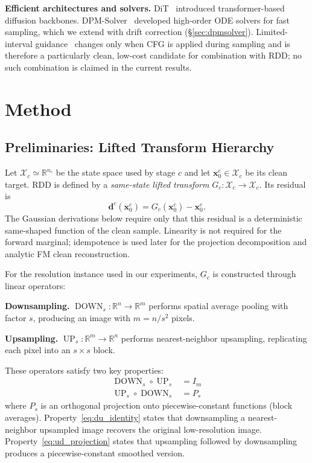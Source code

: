 \documentclass[10pt]{article}
\DeclareMathOperator{\DOWN}{DOWN}
\DeclareMathOperator{\UP}{UP}
\newcommand{\R}{\mathbb{R}}
\newcommand{\bx}{\bm{x}}
\newcommand{\bd}{\bm{d}}
\begin{document}
\textbf{Efficient architectures and solvers.}
DiT~\citep{peebles2023dit} introduced transformer-based diffusion backbones.
DPM-Solver~\citep{lu2022dpm} developed high-order ODE solvers for fast sampling, which we extend with drift correction (\S\ref{sec:dpmsolver}).
Limited-interval guidance~\citep{kynkaanniemi2024guidance} changes only when CFG is applied during sampling and is therefore a particularly clean, low-cost candidate for combination with RDD; no such combination is claimed in the current results.

\section{Method}
\label{sec:method}

\subsection{Preliminaries: Lifted Transform Hierarchy}
\label{sec:prelim}

Let $\mathcal X_c\simeq\R^{n_c}$ be the state space used by stage $c$ and let $\bx_0^c\in\mathcal X_c$ be its clean target. RDD is defined by a \emph{same-state lifted transform} $G_c:\mathcal X_c\to\mathcal X_c$. Its residual is
\begin{equation}
    \bd^c(\bx_0^c)=G_c(\bx_0^c)-\bx_0^c.
    \label{eq:general_residual}
\end{equation}
The Gaussian derivations below require only that this residual is a deterministic same-shaped function of the clean sample. Linearity is not required for the forward marginal; idempotence is used later for the projection decomposition and analytic FM clean reconstruction.

For the resolution instance used in our experiments, $G_c$ is constructed through linear operators:

\textbf{Downsampling.} $\DOWN_s: \R^n \to \R^m$ performs spatial average pooling with factor $s$, producing an image with $m = n/s^2$ pixels.

\textbf{Upsampling.} $\UP_s: \R^m \to \R^n$ performs nearest-neighbor upsampling, replicating each pixel into an $s\times s$ block.

These operators satisfy two key properties:
\begin{align}
    \DOWN_s \circ \UP_s &= I_m \label{eq:du_identity} \\
    \UP_s \circ \DOWN_s &= P_s \label{eq:ud_projection}
\end{align}
where $P_s$ is an orthogonal projection onto piecewise-constant functions (block averages).
Property~\eqref{eq:du_identity} states that downsampling a nearest-neighbor upsampled image recovers the original low-resolution image.
Property~\eqref{eq:ud_projection} states that upsampling followed by downsampling produces a piecewise-constant smoothed version.
\end{document}
